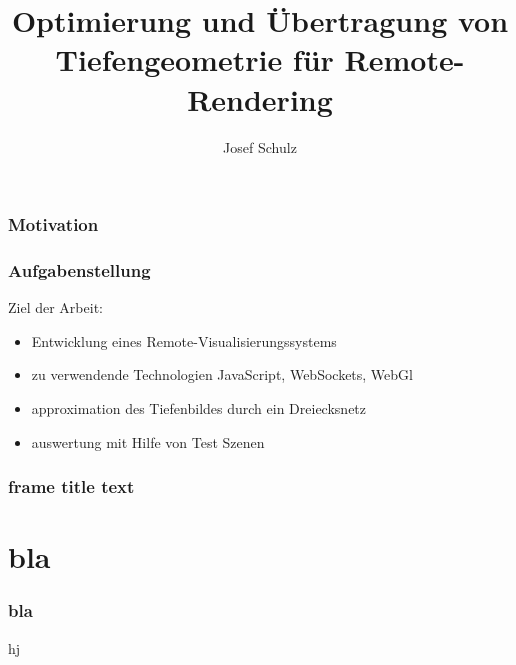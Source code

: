 \documentclass[xcolor=dvipsnames]{beamer}
\title{Optimierung und Übertragung von Tiefengeometrie für Remote-Rendering}
\author{Josef Schulz}
\institute{Technische Universität Dresden}
\begin{document}
\begin{frame}
	\maketitle
	\nocite*{}
	\thispagestyle{empty}
\end{frame}

\begin{frame}
	\frametitle{Motivation}
	\begin{figure}
	\centering
	
		\end{figure}
\end{frame}

\begin{frame}
	\frametitle{Aufgabenstellung}
	
	Ziel der Arbeit:	
	
	\vspace*{0.4cm}
	
	\begin{itemize}
		\setlength{\itemsep}{8pt}
		
		\item Entwicklung eines Remote-Visualisierungssystems
		\item zu verwendende Technologien JavaScript, WebSockets, WebGl
		\item approximation des Tiefenbildes durch ein Dreiecksnetz
		\item auswertung mit Hilfe von Test Szenen
	\end{itemize}
	
\end{frame}

\begin{frame}
	\frametitle{frame title text}
	\tableofcontents
\end{frame}

\section{bla}
\begin{frame}
\frametitle{bla}
hj
\end{frame}

{\tiny}
\end{document}
